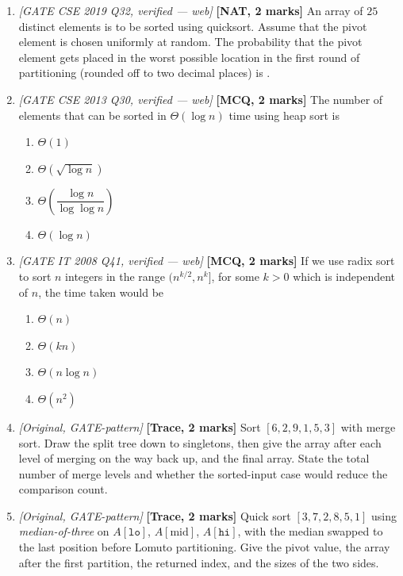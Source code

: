 \documentclass[11pt]{article}
\begin{document}
\begin{enumerate}
\item[\textbf{Q4}] \textit{[GATE CSE 2019 Q32, verified --- web]} \textbf{[NAT, 2 marks]} An array of $25$ distinct elements is to be sorted using quicksort. Assume that the pivot element is chosen uniformly at random. The probability that the pivot element gets placed in the worst possible location in the first round of partitioning (rounded off to two decimal places) is \underline{\hspace{1.2cm}}.

\item[\textbf{Q5}] \textit{[GATE CSE 2013 Q30, verified --- web]} \textbf{[MCQ, 2 marks]} The number of elements that can be sorted in $\Theta(\log n)$ time using heap sort is
\begin{enumerate}
  \item[(A)] $\Theta(1)$
  \item[(B)] $\Theta(\sqrt{\log n})$
  \item[(C)] $\Theta\!\left(\dfrac{\log n}{\log\log n}\right)$
  \item[(D)] $\Theta(\log n)$
\end{enumerate}

\item[\textbf{Q6}] \textit{[GATE IT 2008 Q41, verified --- web]} \textbf{[MCQ, 2 marks]} If we use radix sort to sort $n$ integers in the range $(n^{k/2}, n^k]$, for some $k>0$ which is independent of $n$, the time taken would be
\begin{enumerate}
  \item[(A)] $\Theta(n)$
  \item[(B)] $\Theta(kn)$
  \item[(C)] $\Theta(n\log n)$
  \item[(D)] $\Theta(n^2)$
\end{enumerate}

\item[\textbf{Q7}] \textit{[Original, GATE-pattern]} \textbf{[Trace, 2 marks]} Sort $[6,2,9,1,5,3]$ with merge sort. Draw the split tree down to singletons, then give the array after each level of merging on the way back up, and the final array. State the total number of merge levels and whether the sorted-input case would reduce the comparison count.

\item[\textbf{Q8}] \textit{[Original, GATE-pattern]} \textbf{[Trace, 2 marks]} Quick sort $[3,7,2,8,5,1]$ using \emph{median-of-three} on $A[\texttt{lo}]$, $A[\text{mid}]$, $A[\texttt{hi}]$, with the median swapped to the last position before Lomuto partitioning. Give the pivot value, the array after the first partition, the returned index, and the sizes of the two sides.


\end{enumerate}
\end{document}
